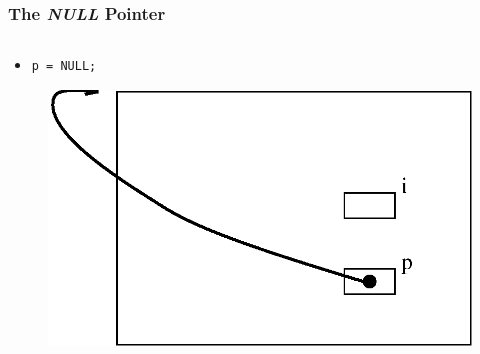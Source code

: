 
\begin{frame}[fragile]
\frametitle{The {\em NULL} Pointer}
\begin{columns}[T]

\begin{column}{0.45\textwidth}
\begin{itemize}[<+->]
\item 
\begin{verbatim}
p = NULL;
\end{verbatim}
\end{itemize}
\begin{center}
\begin{figure}[h]
\centerline{
\includegraphics[scale=0.40]{../Figs/point8_2.eps}
}
\end{figure}
\end{center}
\end{column}


\end{columns}
\end{frame}
